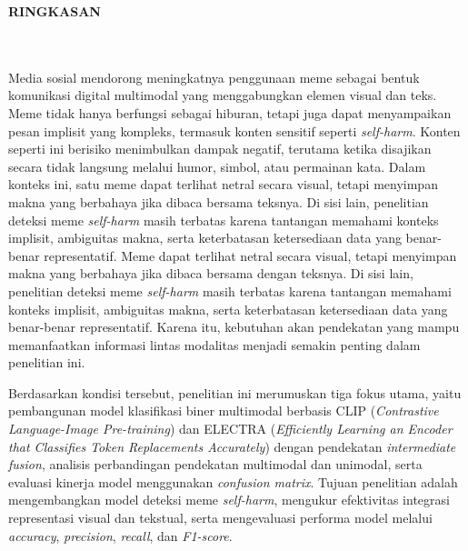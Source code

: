 \clearpage
{}%
\thispagestyle{fancy}

\begin{center}
	\large \bfseries \MakeUppercase{Ringkasan}\\
	\normalsize \normalfont {\thetitle}\\
	\normalsize \normalfont {\theauthor}\\
	\bigskip
	
	\normalsize \normalfont \justifying
	\normalsize \normalfont \justifying
	 Media sosial mendorong meningkatnya penggunaan meme sebagai bentuk komunikasi digital multimodal yang menggabungkan elemen visual dan teks. Meme tidak hanya berfungsi sebagai hiburan, tetapi juga dapat menyampaikan pesan implisit yang kompleks, termasuk konten sensitif seperti \textit{self-harm}. Konten seperti ini berisiko menimbulkan dampak negatif, terutama ketika disajikan secara tidak langsung melalui humor, simbol, atau permainan kata. Dalam konteks ini, satu meme dapat terlihat netral secara visual, tetapi menyimpan makna yang berbahaya jika dibaca bersama teksnya. Di sisi lain, penelitian deteksi meme \textit{self-harm} masih terbatas karena tantangan memahami konteks implisit, ambiguitas makna, serta keterbatasan ketersediaan data yang benar-benar representatif. Meme dapat terlihat netral secara visual, tetapi menyimpan makna yang berbahaya jika dibaca bersama dengan teksnya. Di sisi lain, penelitian deteksi meme \textit{self-harm} masih terbatas karena tantangan memahami konteks implisit, ambiguitas makna, serta keterbatasan ketersediaan data yang benar-benar representatif. Karena itu, kebutuhan akan pendekatan yang mampu memanfaatkan informasi lintas modalitas menjadi semakin penting dalam penelitian ini.
	 
	 Berdasarkan kondisi tersebut, penelitian ini merumuskan tiga fokus utama, yaitu pembangunan model klasifikasi biner multimodal berbasis CLIP (\textit{Contrastive Language-Image Pre-training}) dan ELECTRA (\textit{Efficiently Learning an Encoder that Classifies Token Replacements Accurately}) dengan pendekatan \textit{intermediate fusion}, analisis perbandingan pendekatan multimodal dan unimodal, serta evaluasi kinerja model menggunakan \textit{confusion matrix}. Tujuan penelitian adalah mengembangkan model deteksi meme \textit{self-harm}, mengukur efektivitas integrasi representasi visual dan tekstual, serta mengevaluasi performa model melalui \textit{accuracy}, \textit{precision}, \textit{recall}, dan \textit{F1-score}.
	 

\end{center}
